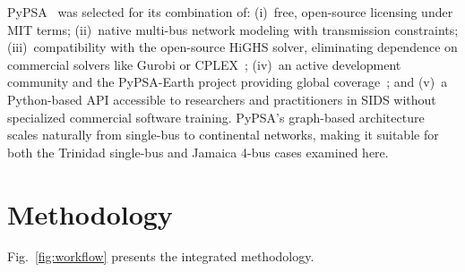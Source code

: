 \documentclass[conference,10pt]{IEEEtran}
\begin{document}
PyPSA~\cite{pypsa} was selected for its combination of: (i)~free, open-source licensing under MIT terms; (ii)~native multi-bus network modeling with transmission constraints; (iii)~compatibility with the open-source HiGHS solver, eliminating dependence on commercial solvers like Gurobi or CPLEX~\cite{highs}; (iv)~an active development community and the PyPSA-Earth project providing global coverage~\cite{pypsa_earth}; and (v)~a Python-based API accessible to researchers and practitioners in SIDS without specialized commercial software training. PyPSA's graph-based architecture scales naturally from single-bus to continental networks, making it suitable for both the Trinidad single-bus and Jamaica 4-bus cases examined here.

\section{Methodology}

Fig.~\ref{fig:workflow} presents the integrated methodology.
\end{document}
